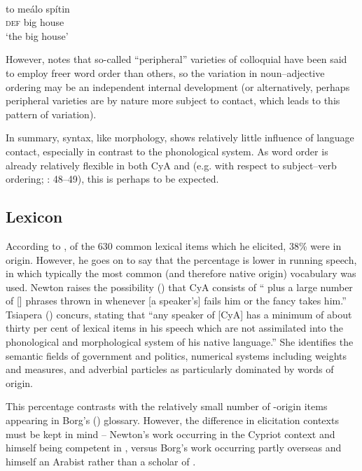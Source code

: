 \documentclass[output=paper]{langsci/langscibook}
\begin{document}
\ex
{}\\
\gll to meálo spítin\\
     \textsc{def} big house  \\
\glt ‘the big house’
\z
\z

However, \citet{Borg2004} notes that so-called “peripheral” varieties of colloquial  have been said to employ freer {word order} than others, so the variation in noun–adjective ordering may be an independent internal development (or alternatively, perhaps peripheral varieties are by nature more subject to contact, which leads to this pattern of variation).


In summary, syntax, like morphology, shows relatively little influence of language contact, especially in contrast to the phonological system. As {word order} is already relatively flexible in both CyA and  (e.g. with respect to subject–verb ordering; \citealt{Newton1964}: 48–49), this is perhaps to be expected.

\subsection{Lexicon}

According to \citet{Newton1964}, of the 630 common lexical items which he elicited, 38\% were  in origin. However, he goes on to say that the percentage is lower in running speech, in which typically the most common (and therefore native  origin) vocabulary was used. Newton raises the possibility (\citeyear[51]{Newton1964}) that CyA consists of “ plus a large number of  [] phrases thrown in whenever [a speaker’s]  fails him or the fancy takes him.” Tsiapera (\citeyear[124]{Tsiapera1964}) concurs, stating that “any speaker of [CyA] has a minimum of about thirty per cent of  lexical items in his speech which are not assimilated into the phonological and morphological system of his native language.” She identifies the semantic fields of government and politics, numerical systems including weights and measures, and adverbial particles as particularly dominated by words of  origin.

This percentage contrasts with the relatively small number of -origin items appearing in Borg's (\citeyear{Borg2004}) glossary. However, the difference in elicitation contexts must be kept in mind – Newton’s work occurring in the Cypriot context and himself being competent in , versus Borg’s work occurring partly overseas and himself an Arabist rather than a scholar of .
\end{document}
